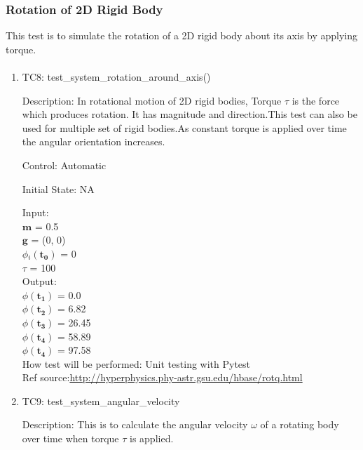 \documentclass[12pt, titlepage]{article}
\begin{document}
\subsubsection{Rotation of 2D Rigid Body}
This test is to simulate the rotation of a 2D rigid body about its axis by applying torque.
\paragraph{}
\begin{enumerate}
\item{TC8: test\_system\_rotation\_around\_axis()\\}
	
	Description: In rotational motion of 2D rigid bodies, Torque $\tau$ is the force which produces rotation. It has magnitude and direction.This test can also be used for multiple set of rigid bodies.As constant torque is applied over time the angular orientation increases.
	
	Control: Automatic
	
	Initial State: NA
	
	Input:\\
    \hspace*{1.3cm}$\mathbf{m}$$\mathbf{}$ = 0.5\\
	\hspace*{1.3cm}$\mathbf{g}$$\mathbf{}$ = (0, 0)\\
	\hspace*{1.3cm}$\phi$$_i\mathbf{(t_0)}$ = 0\\
	\hspace*{1.3cm}$\tau$$\mathbf{}$ = 100 \\
	
	Output:\\
	$\phi$$\mathbf{(t_1)}$ = 0.0\\
	$\phi$$\mathbf{(t_2)}$ = 6.82\\
	$\phi$$\mathbf{(t_3)}$ = 26.45\\
	$\phi$$\mathbf{(t_4)}$ = 58.89\\
	$\phi$$\mathbf{(t_4)}$ = 97.58\\

	
	How test will be performed: Unit testing with Pytest\\
Ref source:\url{http://hyperphysics.phy-astr.gsu.edu/hbase/rotq.html} 

\item{TC9: test\_system\_angular\_velocity\\}

Description: This is to calculate the angular velocity $\omega$ of a rotating body over time when torque $\tau$ is applied.


\end{enumerate}
\end{document}
